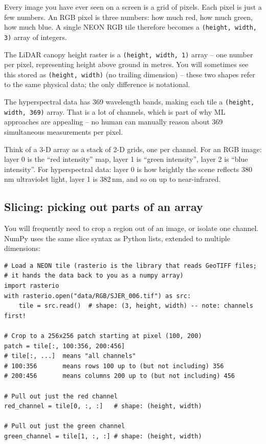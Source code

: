 \documentclass[11pt, a4paper]{article}
\newenvironment{intuition}{%
  \begin{tcolorbox}[
    colback=warnbg, colframe=warnframe,
    fonttitle=\bfseries, title=Intuition,
    breakable, enhanced
  ]
}{%
  \end{tcolorbox}
}
\begin{document}
Every image you have ever seen on a screen is a grid of pixels. Each pixel is
just a few numbers. An RGB pixel is three numbers: how much red, how much
green, how much blue. A single NEON RGB tile therefore becomes a
\lstinline{(height, width, 3)} array of integers.

The LiDAR canopy height raster is a \lstinline{(height, width, 1)} array --
one number per pixel, representing height above ground in metres. You will
sometimes see this stored as \lstinline{(height, width)} (no trailing
dimension) -- these two shapes refer to the same physical data; the only
difference is notational.

The hyperspectral data has 369 wavelength bands, making each tile a
\lstinline{(height, width, 369)} array. That is a lot of channels, which is
part of why ML approaches are appealing -- no human can manually reason about
369 simultaneous measurements per pixel.

\begin{intuition}
  Think of a 3-D array as a stack of 2-D grids, one per channel. For an RGB
  image: layer 0 is the ``red intensity'' map, layer 1 is ``green intensity'',
  layer 2 is ``blue intensity''. For hyperspectral data: layer 0 is how
  brightly the scene reflects 380\,nm ultraviolet light, layer 1 is 382\,nm,
  and so on up to near-infrared.
\end{intuition}

\subsection{Slicing: picking out parts of an array}

You will frequently need to crop a region out of an image, or isolate one
channel. NumPy uses the same slice syntax as Python lists, extended to multiple
dimensions:

\begin{lstlisting}
# Load a NEON tile (rasterio is the library that reads GeoTIFF files;
# it hands the data back to you as a numpy array)
import rasterio
with rasterio.open("data/RGB/SJER_006.tif") as src:
    tile = src.read()  # shape: (3, height, width) -- note: channels first!

# Crop to a 256x256 patch starting at pixel (100, 200)
patch = tile[:, 100:356, 200:456]
# tile[:, ...]  means "all channels"
# 100:356       means rows 100 up to (but not including) 356
# 200:456       means columns 200 up to (but not including) 456

# Pull out just the red channel
red_channel = tile[0, :, :]   # shape: (height, width)

# Pull out just the green channel
green_channel = tile[1, :, :] # shape: (height, width)
\end{lstlisting}
\end{document}

